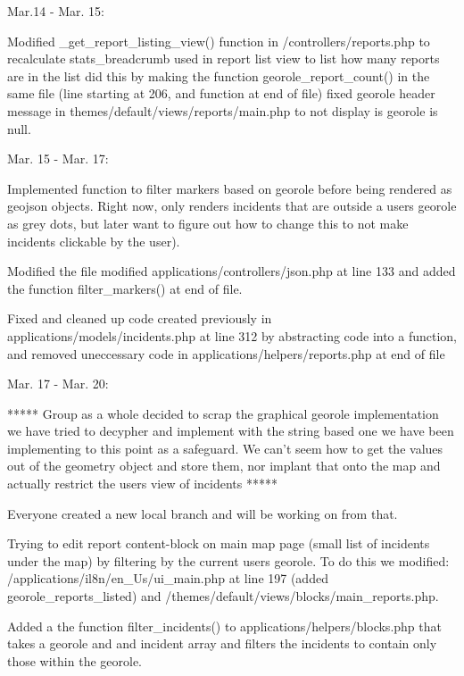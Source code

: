 \documentclass{article}
\begin{document}
Mar.14 - Mar. 15:
                                
    Modified _get_report_listing_view() function in /controllers/reports.php to
    recalculate stats_breadcrumb used in report list view to list how many reports are in the list did this by 
    making the function georole_report_count() in the same file (line starting at 206, and function at end of file)
    fixed georole header message in themes/default/views/reports/main.php to not display is georole is null.
                    
Mar. 15 - Mar. 17:
    
    Implemented function to filter markers based on georole before being rendered as geojson objects.
    Right now, only renders incidents that are outside a users georole as grey dots, but later want to
    figure out how to change this to not make incidents clickable by the user).
    
    Modified the file modified applications/controllers/json.php at line 133 and added the function
    filter_markers() at end of file.
    
    Fixed and cleaned up code created previously in applications/models/incidents.php at line 312
    by abstracting code into a function, and removed uneccessary code in applications/helpers/reports.php at end of file
                
Mar. 17 - Mar. 20:

    ***** Group as a whole decided to scrap the graphical georole implementation we have tried to decypher and
    implement with the string based one we have been implementing to this point as a safeguard.  We can't seem
    how to get the values out of the geometry object and store them, nor implant that onto the map and actually
    restrict the users view of incidents *****

    Everyone created a new local branch and will be working on from that.
    
    Trying to edit report content-block on main map page (small list of incidents under the map) by filtering by 
    the current users georole.  To do this we modified: /applications/il8n/en_Us/ui_main.php at line 197 
    (added georole_reports_listed) and /themes/default/views/blocks/main_reports.php.
          
    Added a the function filter_incidents() to applications/helpers/blocks.php that takes a georole and
    and incident array and filters the incidents to contain only those within the georole.
                
\end{document}

